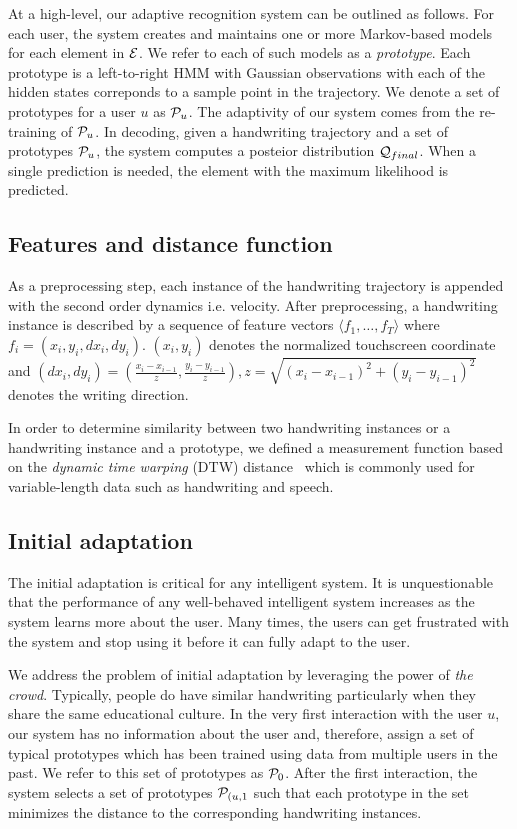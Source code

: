\documentclass{sigchi}
\begin{document}
At a high-level, our adaptive recognition system can be outlined as
follows. For each user, the system creates and maintains one or more
Markov-based models~\cite{ThomasPloetz2011} for each element in
$\mathcal{E}$. We refer to each of such models as a {\em
  prototype}. Each prototype is a left-to-right HMM with Gaussian
observations with each of the hidden states correponds to a sample
point in the trajectory. We denote a set of prototypes for a user $u$
as $\mathcal{P}_u$. The adaptivity of our system comes from the
re-training of $\mathcal{P}_u$. In decoding, given a handwriting
trajectory and a set of prototypes $\mathcal{P}_u$, the system
computes a posteior distribution $\mathcal{Q}_{final}$. When a single
prediction is needed, the element with the maximum likelihood is
predicted.

\subsection{Features and distance function}

As a preprocessing step, each instance of the handwriting trajectory
is appended with the second order dynamics i.e. velocity. After
preprocessing, a handwriting instance is described by a sequence of
feature vectors $\langle f_1, \ldots, f_T \rangle$ where
$f_i = (x_i,y_i, dx_i,dy_i)$. $(x_i,y_i)$ denotes the normalized
touchscreen coordinate and $(dx_i,dy_i) = (\frac{x_i - x_{i-1}}{z},
\frac{y_i - y_{i-1}}{z}) , z = \sqrt{(x_i - x_{i-1})^2 + (y_i -
  y_{i-1})^2}$ denotes the writing direction.

In order to determine similarity between two handwriting instances
or a handwriting instance and a prototype, we defined a measurement
function based on the {\it dynamic time warping} (DTW)
distance~\cite{Rabiner1993} which is commonly used for variable-length
data such as handwriting and speech.

\subsection{Initial adaptation}

The initial adaptation is critical for any intelligent system. It is
unquestionable that the performance of any well-behaved
intelligent system increases as the system learns more about the
user. Many times, the users can get frustrated with the system and stop
using it before it can fully adapt to the user.
 
We address the problem of initial adaptation by leveraging the power
of {\em the crowd}. Typically, people do have similar handwriting
particularly when they share the same educational culture. In the very
first interaction with the user $u$, our system has no information
about the user and, therefore, assign a set of typical prototypes
which has been trained using data from multiple users in the past.  We
refer to this set of prototypes as $\mathcal{P}_0$. After the first
interaction, the system selects a set of prototypes
$\mathcal{P}_{(u,1}$ such that each prototype in the set minimizes
the distance to the corresponding handwriting instances.
\end{document}
